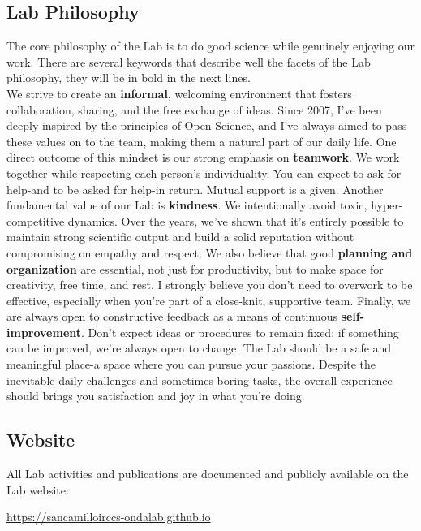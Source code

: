 \documentclass[12pt]{article}
\begin{document}
\subsection{Lab Philosophy}
The core philosophy of the Lab is to do good science while genuinely enjoying our work. There are several keywords that describe well the facets of the Lab philosophy, they will be in bold in the next lines.\\
We strive to create an \textbf{informal}, welcoming environment that fosters collaboration, sharing, and the free exchange of ideas.
Since 2007, I've been deeply inspired by the principles of Open Science, and I've always aimed to pass these values on to the team, making them a natural part of our daily life.
One direct outcome of this mindset is our strong emphasis on \textbf{teamwork}. We work together while respecting each person's individuality. You can expect to ask for help-and to be asked for help-in return. Mutual support is a given.
Another fundamental value of our Lab is \textbf{kindness}. We intentionally avoid toxic, hyper-competitive dynamics. Over the years, we've shown that it's entirely possible to maintain strong scientific output and build a solid reputation without compromising on empathy and respect.
We also believe that good \textbf{planning and organization} are essential, not just for productivity, but to make space for creativity, free time, and rest. I strongly believe you don't need to overwork to be effective, especially when you're part of a close-knit, supportive team.
Finally, we are always open to constructive feedback as a means of continuous \textbf{self-improvement}. Don't expect ideas or procedures to remain fixed: if something can be improved, we're always open to change.
The Lab should be a safe and meaningful place-a space where you can pursue your passions. Despite the inevitable daily challenges and sometimes boring tasks, the overall experience should brings you satisfaction and joy in what you're doing.

\pagebreak

\subsection{Website}

All Lab activities and publications are documented and publicly 
available on the Lab website:
\begin{center}
    \url{https://sancamilloirccs-ondalab.github.io}
\end{center}
\end{document}
